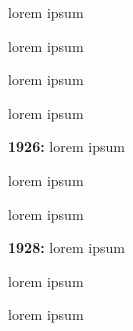 


lorem ipsum
\begin{myquote}
\item{} 
\begin{myitemize}
\item{}  lorem ipsum
\end{myitemize}

\begin{myquote}
\item{} 
\begin{myquote}
\item{}  lorem ipsum
\item{}  lorem ipsum
\end{myquote}

\end{myquote}

\begin{myitemize}
\item{}  {\bfseries 1926:} lorem ipsum
\end{myitemize}

\begin{myquote}
\item{} 
\begin{myquote}
\item{}  lorem ipsum
\item{}  lorem ipsum
\end{myquote}

\end{myquote}

\begin{myitemize}
\item{}  {\bfseries 1928:} lorem ipsum 
\end{myitemize}

\begin{myquote}
\item{} 
\begin{myquote}
\item{}  lorem ipsum
\end{myquote}

\end{myquote}

\end{myquote}

lorem ipsum




